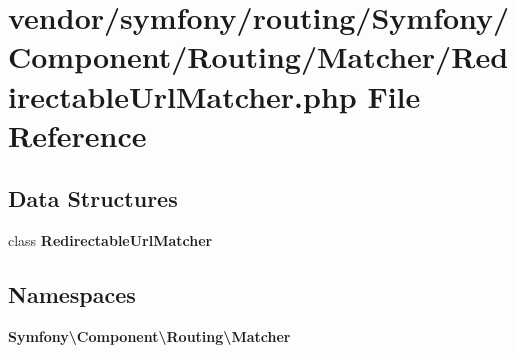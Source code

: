 \section{vendor/symfony/routing/\+Symfony/\+Component/\+Routing/\+Matcher/\+Redirectable\+Url\+Matcher.php File Reference}
\label{_matcher_2_redirectable_url_matcher_8php}
\subsection*{Data Structures}
\begin{DoxyCompactItemize}
\item 
class {\bf Redirectable\+Url\+Matcher}
\end{DoxyCompactItemize}
\subsection*{Namespaces}
\begin{DoxyCompactItemize}
\item 
 {\bf Symfony\textbackslash{}\+Component\textbackslash{}\+Routing\textbackslash{}\+Matcher}
\end{DoxyCompactItemize}
